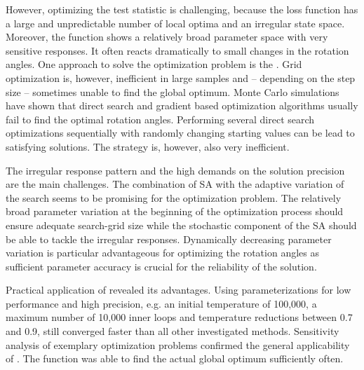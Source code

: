 However, optimizing the test statistic is challenging, because the loss function has a large and unpredictable number of local optima and an irregular state space. Moreover, the function shows a relatively broad parameter space with very sensitive responses. It often reacts dramatically to small changes in the rotation angles. One approach to solve the optimization problem is the  \citep{herwartz_2015}. Grid optimization is, however, inefficient in large samples and -- depending on the step size -- sometimes unable to find the global optimum. Monte Carlo simulations have shown that direct search and gradient based optimization algorithms usually fail to find the optimal rotation angles. Performing several direct search optimizations sequentially with randomly changing starting values can be lead to satisfying solutions. The strategy is, however, also very inefficient.

The irregular response pattern and the high demands on the solution precision are the main challenges. The combination of SA with the adaptive variation of the search seems to be promising for the optimization problem. The relatively broad parameter variation at the beginning of the optimization process should ensure adequate search-grid size while the stochastic component of the SA should be able to tackle the irregular responses. Dynamically decreasing parameter variation is particular advantageous for optimizing the rotation angles as sufficient parameter accuracy is crucial for the reliability of the solution.

Practical application of  revealed its advantages. Using parameterizations for low performance and high precision, e.g. an initial temperature of 100,000, a maximum number of 10,000 inner loops and temperature reductions between 0.7 and 0.9, still converged faster than all other investigated methods. Sensitivity analysis of exemplary optimization problems confirmed the general applicability of . The function was able to find the actual global optimum sufficiently often.

